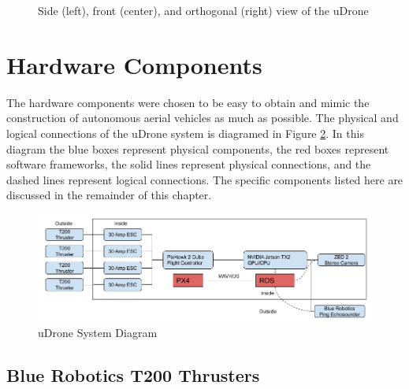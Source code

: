 \begin{figure}[h]
\centering
{}
\caption[Side, front, and orthogonal view of the uDrone]{Side (left), front (center), and orthogonal (right) view of the uDrone}
\label{3ways}
\end{figure}

\section{Hardware Components}
The hardware components were chosen to be easy to obtain and mimic the construction of autonomous aerial vehicles as much as possible. The  physical and logical connections of the uDrone system is diagramed in Figure \ref{system_diagram}. In this diagram the blue boxes represent physical components, the red boxes represent software frameworks, the solid lines represent physical connections, and the dashed lines represent logical connections. The specific components listed here are discussed in the remainder of this chapter. 

\begin{figure}[h]
\includegraphics[width=\maxwidth{\textwidth}]{img/uDrone System Diagram.png}
\caption{uDrone System Diagram}
\label{system_diagram}
\end{figure}



\subsection{Blue Robotics T200 Thrusters}


